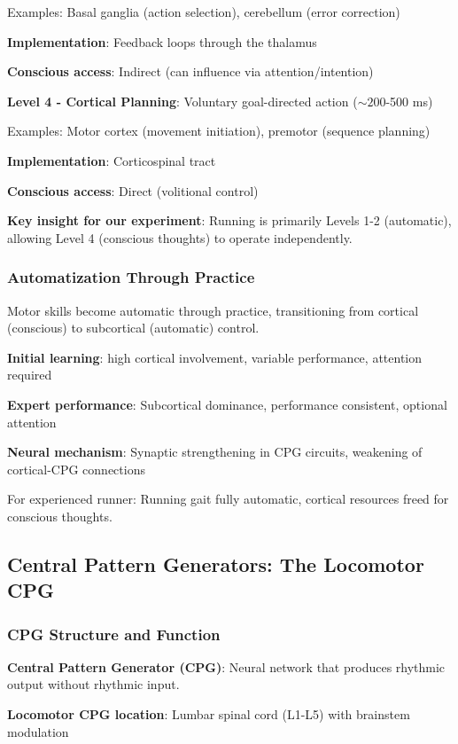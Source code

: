 \documentclass[11pt,onecolumn]{article}
\begin{document}
Examples: Basal ganglia (action selection), cerebellum (error correction)

\textbf{Implementation}: Feedback loops through the thalamus

\textbf{Conscious access}: Indirect (can influence via attention/intention)

\textbf{Level 4 - Cortical Planning}: Voluntary goal-directed action ($\sim 200$-500 ms)

Examples: Motor cortex (movement initiation), premotor (sequence planning)

\textbf{Implementation}: Corticospinal tract

\textbf{Conscious access}: Direct (volitional control)

\textbf{Key insight for our experiment}: Running is primarily Levels 1-2 (automatic), allowing Level 4 (conscious thoughts) to operate independently.

\subsubsection{Automatization Through Practice}

Motor skills become automatic through practice, transitioning from cortical (conscious) to subcortical (automatic) control.

\textbf{Initial learning}: high cortical involvement, variable performance, attention required

\textbf{Expert performance}: Subcortical dominance, performance consistent, optional attention

\textbf{Neural mechanism}: Synaptic strengthening in CPG circuits, weakening of cortical-CPG connections

For experienced runner: Running gait fully automatic, cortical resources freed for conscious thoughts.

\subsection{Central Pattern Generators: The Locomotor CPG}

\subsubsection{CPG Structure and Function}

\textbf{Central Pattern Generator (CPG)}: Neural network that produces rhythmic output without rhythmic input.

\textbf{Locomotor CPG location}: Lumbar spinal cord (L1-L5) with brainstem modulation
\end{document}

